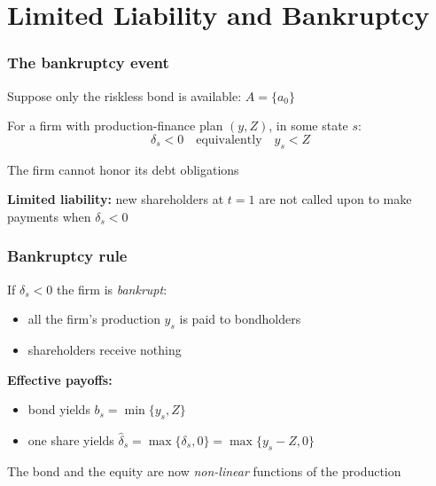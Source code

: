 \documentclass[blue]{beamer}
\theoremstyle{definition}
\theoremstyle{example}
\begin{document}



\section{Limited Liability and Bankruptcy}

\begin{frame}\frametitle{The bankruptcy event}
Suppose only the riskless bond is available: $A = \{a_0\}$
\bigskip

For a firm with production-finance plan $(y, Z)$, in some state $s$:
\begin{equation*}
\delta_s < 0 \quad \text{equivalently} \quad y_s < Z
\end{equation*}

\medskip

The firm cannot honor its debt obligations
\bigskip

\textbf{Limited liability:} new shareholders at $t=1$ are not called upon to make payments when $\delta_s < 0$
\end{frame}

\begin{frame}\frametitle{Bankruptcy rule}
If $\delta_s < 0$ the firm is \emph{bankrupt}:
\begin{itemize}
\item all the firm's production $y_s$ is paid to bondholders
\item shareholders receive nothing
\end{itemize}
\bigskip

\textbf{Effective payoffs:}
\begin{itemize}
\item bond yields $b_s = \min\{y_s, Z\}$
\item one share yields $\widehat{\delta}_s = \max\{\delta_s, 0\} = \max\{y_s - Z, 0\}$
\end{itemize}
\bigskip

The bond and the equity are now \emph{non-linear} functions of the production
\end{frame}
\end{document}
